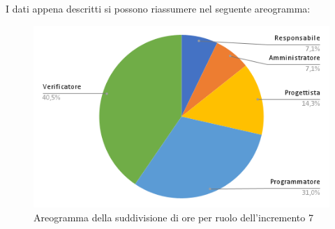 \pagebreak
I dati appena descritti si possono riassumere nel seguente areogramma:
\begin{figure}[!h]
    \vspace{5px}
    \includegraphics[scale=0.5]{../../../Images/Diagrammi/Diagramma a torta/areogrammaIncremento12.png}
    \centering
    \caption{Areogramma della suddivisione di ore per ruolo dell'incremento 7}
\end{figure}

